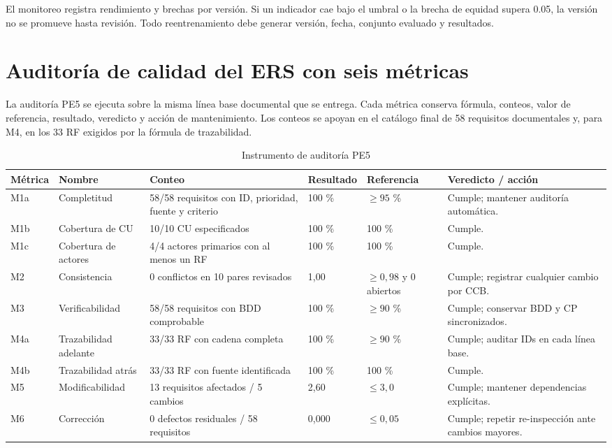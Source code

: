 \documentclass[12pt,a4paper]{article}
\begin{document}
El monitoreo registra rendimiento y brechas por versión. Si un indicador cae bajo el umbral o la brecha de equidad supera 0.05, la versión no se promueve hasta revisión. Todo reentrenamiento debe generar versión, fecha, conjunto evaluado y resultados.

\section{Auditoría de calidad del ERS con seis métricas}
La auditoría PE5 se ejecuta sobre la misma línea base documental que se entrega. Cada métrica conserva fórmula, conteos, valor de referencia, resultado, veredicto y acción de mantenimiento. Los conteos se apoyan en el catálogo final de 58 requisitos documentales y, para M4, en los 33 RF exigidos por la fórmula de trazabilidad.

\begin{table}[H]\centering\caption{Instrumento de auditoría PE5}\scriptsize
\begin{tabularx}{\textwidth}{p{}p{}p{}p{}p{}X}\toprule
\textbf{Métrica}&\textbf{Nombre}&\textbf{Conteo}&\textbf{Resultado}&\textbf{Referencia}&\textbf{Veredicto / acción}\\\midrule
M1a&Completitud&58/58 requisitos con ID, prioridad, fuente y criterio&100 \%&$\geq95$ \%&Cumple; mantener auditoría automática.\\
M1b&Cobertura de CU&10/10 CU especificados&100 \%&100 \%&Cumple.\\
M1c&Cobertura de actores&4/4 actores primarios con al menos un RF&100 \%&100 \%&Cumple.\\
M2&Consistencia&0 conflictos en 10 pares revisados&1,00&$\geq0,98$ y 0 abiertos&Cumple; registrar cualquier cambio por CCB.\\
M3&Verificabilidad&58/58 requisitos con BDD comprobable&100 \%&$\geq90$ \%&Cumple; conservar BDD y CP sincronizados.\\
M4a&Trazabilidad adelante&33/33 RF con cadena completa&100 \%&$\geq90$ \%&Cumple; auditar IDs en cada línea base.\\
M4b&Trazabilidad atrás&33/33 RF con fuente identificada&100 \%&100 \%&Cumple.\\
M5&Modificabilidad&13 requisitos afectados / 5 cambios&2,60&$\leq3,0$&Cumple; mantener dependencias explícitas.\\
M6&Corrección&0 defectos residuales / 58 requisitos&0,000&$\leq0,05$&Cumple; repetir re-inspección ante cambios mayores.\\\bottomrule
\end{tabularx}\normalsize\end{table}
\end{document}
